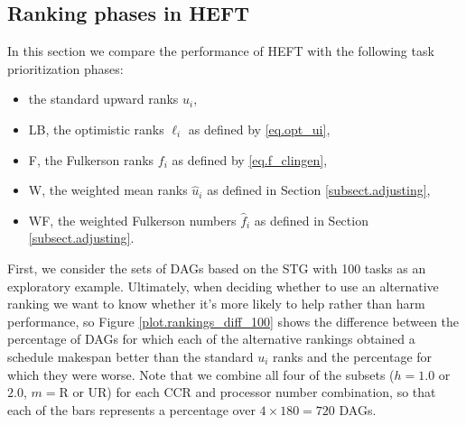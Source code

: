 \documentclass[12pt]{article}
\begin{document}


\subsection{Ranking phases in HEFT}
\label{subsect.evaluation}

In this section we compare the performance of HEFT with the following task prioritization phases:
\begin{itemize}
	\item the standard upward ranks $u_i$,
	\item LB, the optimistic ranks $\ell_i$ as defined by \eqref{eq.opt_ui},
	\item F, the Fulkerson ranks $f_i$ as defined by \eqref{eq.f_clingen},
	\item W, the weighted mean ranks $\hat{u}_i$ as defined in Section \ref{subsect.adjusting},
	\item WF, the weighted Fulkerson numbers $\hat{f}_i$ as defined in Section \ref{subsect.adjusting}.
\end{itemize}
First, we consider the sets of DAGs based on the STG with 100 tasks as an exploratory example. Ultimately, when deciding whether to use an alternative ranking we want to know whether it's more likely to help rather than harm performance, so Figure \ref{plot.rankings_diff_100} shows the difference between the percentage of DAGs for which each of the alternative rankings obtained a schedule makespan better than the standard $u_i$ ranks and the percentage for which they were worse. Note that we combine all four of the subsets ($h = 1.0$ or $2.0$, $m = \text{R}$ or UR) for each CCR and processor number combination, so that each of the bars represents a percentage over $4 \times 180 = 720$ DAGs.
\end{document}
